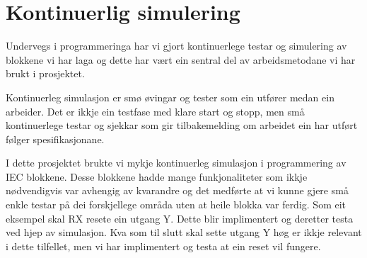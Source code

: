 \section{Kontinuerlig simulering}
\thispagestyle{fancy}

Undervegs i programmeringa har vi gjort kontinuerlege testar og simulering av blokkene vi har laga og
dette har vært ein sentral del av arbeidsmetodane vi har brukt i prosjektet. 

Kontinuerleg simulasjon er smø øvingar og tester som ein utfører medan ein arbeider.
Det er ikkje ein testfase med klare start og stopp, men små kontinuerlege testar og sjekkar som gir tilbakemelding
om arbeidet ein har utført følger spesifikasjonane.

I dette prosjektet brukte vi mykje kontinuerleg simulasjon i programmering av IEC blokkene.
Desse blokkene hadde mange funkjonaliteter som ikkje nødvendigvis var avhengig av kvarandre og
det medførte at vi kunne gjere små enkle testar på dei forskjellege områda uten at heile blokka var ferdig. \newline
Som eit eksempel skal RX resete ein utgang Y. Dette blir implimentert og deretter testa ved hjep av simulasjon.
Kva som til slutt skal sette utgang Y høg er ikkje relevant i dette tilfellet, men vi har implimentert 
og testa at ein reset vil fungere.

\newpage